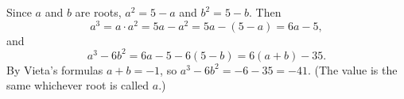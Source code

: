 Since $a$ and $b$ are roots, $a^2=5-a$ and $b^2=5-b$. Then
\[
a^3=a\cdot a^2=5a-a^2=5a-(5-a)=6a-5,
\]
and
\[
a^3-6b^2=6a-5-6(5-b)=6(a+b)-35 .
\]
By Vieta's formulas $a+b=-1$, so $a^3-6b^2=-6-35=\boxed{-41}$. (The value is the same whichever root is called $a$.)
